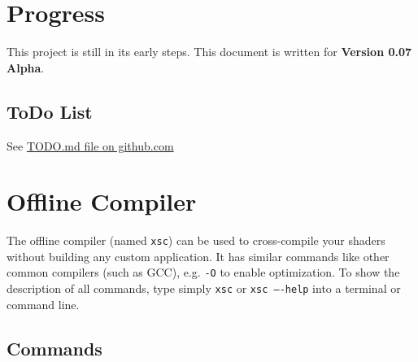 \documentclass{article}
\begin{document}

\newpage
\section{Progress}

This project is still in its early steps. This document is written for \XSC \textbf{Version 0.07 Alpha}.

\subsection{ToDo List}
See \href{https://github.com/LukasBanana/XShaderCompiler/blob/master/TODO.md}{TODO.md file on github.com}



\newpage
\section{Offline Compiler}

The offline compiler (named \texttt{xsc}) can be used to cross-compile your shaders without building any custom application.
It has similar commands like other common compilers (such as GCC), e.g. \texttt{-O} to enable optimization.
To show the description of all commands, type simply \texttt{xsc} or \texttt{xsc ----help} into a terminal or command line.

\subsection{Commands}
\end{document}
